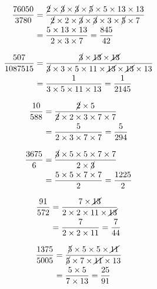 {{\item\begin{align*}
    \dfrac{76050}{3780} &=
    \dfrac{\cancel{2} \times \cancel{3} \times \cancel{3} \times \cancel{5} \times 5 \times 13 \times 13}
    {\cancel{2} \times 2 \times \cancel{3} \times \cancel{3} \times 3 \times \cancel{5} \times 7}\\ &=
    \dfrac{5 \times 13 \times 13}
    {2 \times 3 \times 7} =
    \dfrac{845}{42}
    \end{align*}

\item\begin{align*}
    \dfrac{507}{1087515} &=
    \dfrac{\cancel{3} \times \cancel{13} \times \cancel{13}}
    {\cancel{3} \times 3 \times 5 \times 11 \times \cancel{13} \times \cancel{13} \times 13}\\ &=
    \dfrac{1}
    {3 \times 5 \times 11 \times 13} =
    \dfrac{1}{2145}
    \end{align*}

\item\begin{align*}
    \dfrac{10}{588} &=
    \dfrac{\cancel{2} \times 5}
    {\cancel{2} \times 2 \times 3 \times 7 \times 7}\\ &=
    \dfrac{5}
    {2 \times 3 \times 7 \times 7} =
    \dfrac{5}{294}
    \end{align*}

\item\begin{align*}
    \dfrac{3675}{6} &=
    \dfrac{\cancel{3} \times 5 \times 5 \times 7 \times 7}
    {2 \times \cancel{3}}\\ &=
    \dfrac{5 \times 5 \times 7 \times 7}
    {2} =
    \dfrac{1225}{2}
    \end{align*}

\item\begin{align*}
    \dfrac{91}{572} &=
    \dfrac{7 \times \cancel{13}}
    {2 \times 2 \times 11 \times \cancel{13}}\\ &=
    \dfrac{7}
    {2 \times 2 \times 11} =
    \dfrac{7}{44}
    \end{align*}

\item\begin{align*}
    \dfrac{1375}{5005} &=
    \dfrac{\cancel{5} \times 5 \times 5 \times \cancel{11}}
    {\cancel{5} \times 7 \times \cancel{11} \times 13}\\ &=
    \dfrac{5 \times 5}
    {7 \times 13} =
    \dfrac{25}{91}
    \end{align*}

}}
